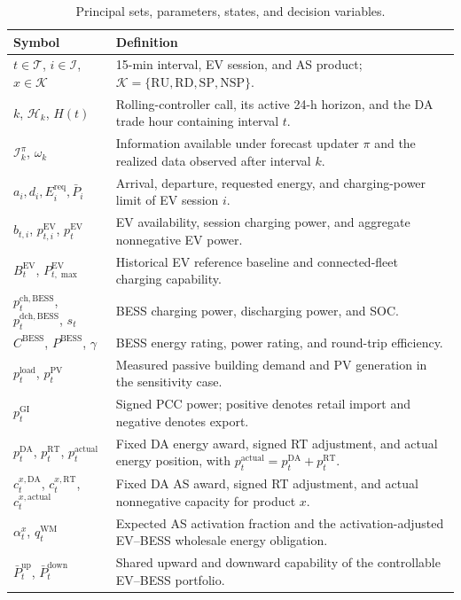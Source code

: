 \documentclass[final,5p,times]{elsarticle}
\newcommand{\EV}{\mathrm{EV}}
\newcommand{\BESS}{\mathrm{BESS}}
\newcommand{\DA}{\mathrm{DA}}
\newcommand{\RT}{\mathrm{RT}}
\newcommand{\GI}{\mathrm{GI}}
\newcommand{\PV}{\mathrm{PV}}
\newcommand{\RU}{\mathrm{RU}}
\newcommand{\RD}{\mathrm{RD}}
\newcommand{\SP}{\mathrm{SP}}
\newcommand{\NSP}{\mathrm{NSP}}
\newcommand{\WM}{\mathrm{WM}}
\newcommand{\ch}{\mathrm{ch}}
\newcommand{\dch}{\mathrm{dch}}
\newcommand{\actual}{\mathrm{actual}}
\newcommand{\req}{\mathrm{req}}
\newcommand{\load}{\mathrm{load}}
\newcommand{\calT}{\mathcal{T}}
\newcommand{\calH}{\mathcal{H}}
\newcommand{\calI}{\mathcal{I}}
\newcommand{\calK}{\mathcal{K}}
\begin{document}
\begin{table}[H]
\centering
\caption{Principal sets, parameters, states, and decision variables.}
\label{tab:nomenclature}
\scriptsize
\begin{tabularx}{\textwidth}{@{}p{}X@{}}
\toprule
Symbol & Definition \\
\midrule
$t\in\calT$, $i\in\calI$, $x\in\calK$ & 15-min interval, EV session, and AS product; $\calK=\{\RU,\RD,\SP,\NSP\}$. \\
$k$, $\calH_k$, $H(t)$ & Rolling-controller call, its active 24-h horizon, and the DA trade hour containing interval $t$. \\
$\mathcal I_k^\pi$, $\omega_k$ & Information available under forecast updater $\pi$ and the realized data observed after interval $k$. \\
$a_i,d_i,E_i^{\req},\bar P_i$ & Arrival, departure, requested energy, and charging-power limit of EV session $i$. \\
$b_{t,i}$, $p_{t,i}^{\EV}$, $p_t^{\EV}$ & EV availability, session charging power, and aggregate nonnegative EV power. \\
$B_t^{\EV}$, $P_{t,\max}^{\EV}$ & Historical EV reference baseline and connected-fleet charging capability. \\
$p_t^{\ch,\BESS}$, $p_t^{\dch,\BESS}$, $s_t$ & BESS charging power, discharging power, and SOC. \\
$C^{\BESS}$, $P^{\BESS}$, $\gamma$ & BESS energy rating, power rating, and round-trip efficiency. \\
$p_t^{\load}$, $p_t^{\PV}$ & Measured passive building demand and PV generation in the sensitivity case. \\
$p_t^{\GI}$ & Signed PCC power; positive denotes retail import and negative denotes export. \\
$p_t^{\DA}$, $p_t^{\RT}$, $p_t^{\actual}$ & Fixed DA energy award, signed RT adjustment, and actual energy position, with $p_t^{\actual}=p_t^{\DA}+p_t^{\RT}$. \\
$c_t^{x,\DA}$, $c_t^{x,\RT}$, $c_t^{x,\actual}$ & Fixed DA AS award, signed RT adjustment, and actual nonnegative capacity for product $x$. \\
$\alpha_t^x$, $q_t^{\WM}$ & Expected AS activation fraction and the activation-adjusted EV--BESS wholesale energy obligation. \\
$\bar P_t^{\mathrm{up}}$, $\bar P_t^{\mathrm{down}}$ & Shared upward and downward capability of the controllable EV--BESS portfolio. \\

\end{tabularx}
\end{table}
\end{document}
